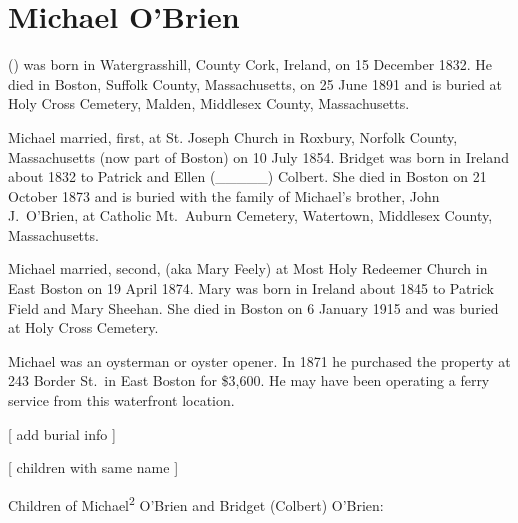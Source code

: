 \section{Michael O'Brien}

 () was born in Watergrasshill, County Cork, Ireland, on 15 December 1832.\cite{Michael2OBrienNaturalization} He died in Boston, Suffolk County, Massachusetts, on 25 June 1891\cite{Michael2OBrienDeath} and is buried at Holy Cross Cemetery, Malden, Middlesex County, Massachusetts.\cite{DianaBerberenaLetter2} 

Michael married, first,  at St. Joseph Church in Roxbury, Norfolk County, Massachusetts (now part of Boston) on 10 July 1854.\cite{BridgetColbertMarriage,BridgetColbertChurchMarriage} Bridget was born in Ireland about 1832 to Patrick and Ellen (\_\_\_\_\_) Colbert.\cite{BridgetColbertMarriage} She died in Boston on 21 October 1873\cite{BridgetColbertDeath} and is buried with the family of Michael's brother, John J.\ O'Brien, at Catholic Mt.\ Auburn Cemetery, Watertown, Middlesex County, Massachusetts.\cite{BillMcEvoy}

Michael married, second,  (aka Mary Feely) at Most Holy Redeemer Church in East Boston on 19 April 1874.\cite{MaryFieldMarriage,MaryFieldChurchMarriage} Mary was born in Ireland about 1845\cite{MaryFieldMarriage} to Patrick Field and Mary Sheehan.\cite{MaryFieldDeath} She died in Boston on 6 January 1915 and was buried at Holy Cross Cemetery.\cite{MaryFieldDeath}

Michael was an oysterman or oyster opener.\cite{EdwardFrancis3OBrienBirth,Michael2OBrien1886} In 1871 he purchased the property at 243 Border St.\ in East Boston for \$3,600.\cite{243BorderPurchase,243BorderMap} He may have been operating a ferry service from this waterfront location.\cite{243BorderFerry}

[ add burial info ]

[ children with same name ]

\begin{KidsIntro}
	Children of Michael\textsuperscript{2} O'Brien and Bridget (Colbert) O'Brien:
\end{KidsIntro}

